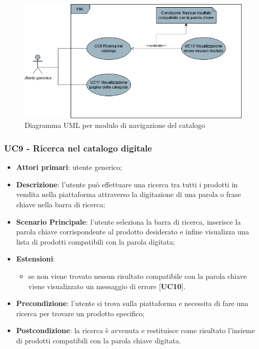 \begin{figure}[H]
\centering
\includegraphics[scale=0.6]{res/UseCase/Immagini/NavigazioneCatalogoGenerale}
\caption{Diagramma UML per modulo di navigazione del catalogo}
\end{figure}
\subsubsection{UC9 - Ricerca nel catalogo digitale}
\begin{itemize}
\item \textbf{Attori primari}: utente generico;
\item \textbf{Descrizione}: l'utente può effettuare una ricerca tra tutti i prodotti in vendita nella piattaforma attraverso la digitazione di una parola o frase chiave nella barra di ricerca;
\item \textbf{Scenario Principale}: l'utente seleziona la barra di ricerca, inserisce la parola chiave corrispondente al prodotto desiderato e infine visualizza una lista di prodotti compatibili con la parola digitata;
\item \textbf{Estensioni}:
\begin{itemize}
\item se non viene trovato nessun risultato compatibile con la parola chiave viene visualizzato un messaggio di errore [\textbf{UC10}].
\end{itemize}
\item \textbf{Precondizione}: l'utente si trova sulla piattaforma e necessita di fare una ricerca per trovare un prodotto specifico;
\item \textbf{Postcondizione}: la ricerca è avvenuta e restituisce come risultato l'insieme di prodotti compatibili con la parola chiave digitata.
\end{itemize}
